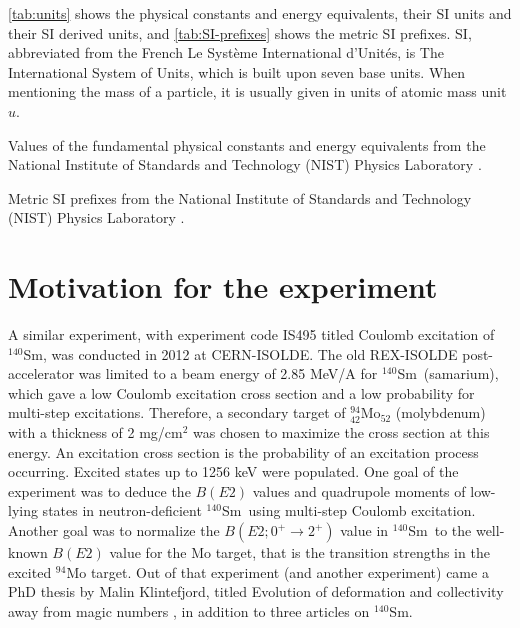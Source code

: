 \documentclass[twoside,english]{uiofysmaster/uiofysmaster}
\newcommand{\Sm}{$^{140}$Sm} %
\let\orgautoref\autoref
\renewcommand{\autoref}
        {%
		 \def\sectionautorefname{Section}%
		 \def\subsectionautorefname{Section}%
		 \def\subsubsectionautorefname{Section}%
		 \def\chapterautorefname{Chapter}%
          \orgautoref}
\begin{document}
\autoref{tab:units} shows the physical constants and energy equivalents, their SI units and their SI derived units, and
\autoref{tab:SI-prefixes} shows the metric SI prefixes.
SI, abbreviated from the French Le Syst{\`{e}}me International d'Unit{\'{e}}s, is The International System of Units, which is built upon seven base units.
When mentioning the mass of a particle, it is usually given in units of atomic mass unit $u$.

\begin{table}[htb] 
    \centering 
    \caption{Values of the fundamental physical constants and energy equivalents from the National Institute of Standards and Technology (NIST) Physics Laboratory \cite{units}.}
	
	\label{tab:units}
\end{table}

\begin{table}[htb] 
    \centering 
    \caption{Metric SI prefixes from the National Institute of Standards and Technology (NIST) Physics Laboratory \cite{units}.}
	
	\label{tab:SI-prefixes}
\end{table}


\section{Motivation for the experiment}

A similar experiment, with experiment code IS495 titled Coulomb excitation of \Sm, was conducted in 2012 at CERN-ISOLDE.
The old REX-ISOLDE post-accelerator was limited to a beam energy of 2.85 MeV/A for \Sm\ (samarium), which gave a low Coulomb excitation cross section and a low probability for multi-step excitations. 
Therefore, a secondary target of $^{94}_{42}$Mo$_{52}$ (molybdenum) with a thickness of 2 mg/cm$^2$ was chosen to maximize the cross section at this energy.
An excitation cross section is the probability of an excitation process occurring.
Excited states up to 1256 keV were populated.
One goal of the experiment was to deduce the $B(E2)$ values and quadrupole moments of low-lying states in neutron-deficient \Sm\ using multi-step Coulomb excitation.
Another goal was to normalize the $B(E2; 0^+ \rightarrow 2^+)$ value in \Sm\ to the well-known $B(E2)$ value for the Mo target, that is the transition strengths in the excited $^{94}$Mo target.
Out of that experiment (and another experiment) came a PhD thesis by Malin Klintefjord, titled Evolution of deformation and collectivity away from magic numbers \cite{Klintefjord}, in addition to three articles \cite{Klintefjord2015, Samorajczyk2015, Klintefjord2016} on \Sm.
\end{document}
